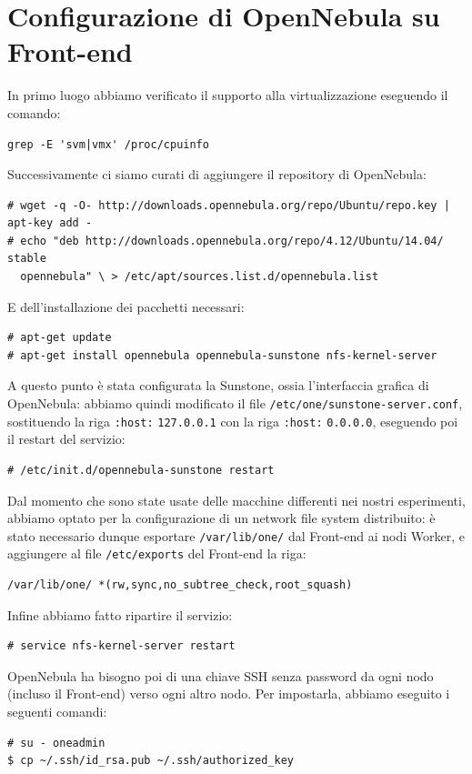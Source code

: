 \documentclass[twoside]{article}
\begin{document}
\section{Configurazione di OpenNebula su Front-end}
In primo luogo abbiamo verificato il supporto alla virtualizzazione eseguendo il comando:
\begin{lstlisting}[frame=trBL]
grep -E 'svm|vmx' /proc/cpuinfo
\end{lstlisting}

Successivamente ci siamo curati di aggiungere il repository di OpenNebula:
\begin{lstlisting}[frame=trBL]
# wget -q -O- http://downloads.opennebula.org/repo/Ubuntu/repo.key | apt-key add -
# echo "deb http://downloads.opennebula.org/repo/4.12/Ubuntu/14.04/ stable 
  opennebula" \ > /etc/apt/sources.list.d/opennebula.list
\end{lstlisting}

E dell'installazione dei pacchetti necessari:
\begin{lstlisting}[frame=trBL]
# apt-get update
# apt-get install opennebula opennebula-sunstone nfs-kernel-server
\end{lstlisting}

A questo punto è stata configurata la Sunstone, ossia l'interfaccia grafica di OpenNebula:
abbiamo quindi modificato il file 
\texttt{/etc/one/sunstone-server.conf}, sostituendo la riga \texttt{:host:} \texttt{127.0.0.1}
con la riga \texttt{:host:} \texttt{0.0.0.0}, eseguendo poi il restart del servizio:
\begin{lstlisting}[frame=trBL]
# /etc/init.d/opennebula-sunstone restart
\end{lstlisting}

Dal momento che sono state usate delle macchine differenti nei nostri esperimenti, abbiamo optato
per la configurazione di un network file system distribuito: è stato necessario dunque esportare
\texttt{/var/lib/one/} dal Front-end ai nodi Worker, e aggiungere al file \texttt{/etc/exports}
del Front-end la riga:
\begin{lstlisting}[frame=trBL]
/var/lib/one/ *(rw,sync,no_subtree_check,root_squash)
\end{lstlisting}

Infine abbiamo fatto ripartire il servizio:
\begin{lstlisting}[frame=trBL]
# service nfs-kernel-server restart
\end{lstlisting}

OpenNebula ha bisogno poi di una chiave SSH senza password da ogni nodo (incluso il Front-end)
verso ogni altro nodo. Per impostarla, abbiamo eseguito i seguenti comandi:
\begin{lstlisting}[frame=trBL]
# su - oneadmin
$ cp ~/.ssh/id_rsa.pub ~/.ssh/authorized_key
\end{lstlisting}
\end{document}
